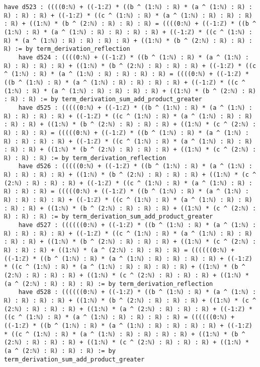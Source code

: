 \documentclass{article}
\begin{document}
\begin{tcolorbox}[colback=white!10, width=\linewidth]
\begin{lstlisting}[language=Lean4]
    have d523 : ((((0:ℕ) + ((-1:ℤ) * ((b ^ (1:ℕ) : ℝ) * (a ^ (1:ℕ) : ℝ) : ℝ) : ℝ) : ℝ) + ((-1:ℤ) * ((c ^ (1:ℕ) : ℝ) * (a ^ (1:ℕ) : ℝ) : ℝ) : ℝ) : ℝ) + ((1:ℕ) * (b ^ (2:ℕ) : ℝ) : ℝ) : ℝ) = ((((0:ℕ) + ((-1:ℤ) * ((b ^ (1:ℕ) : ℝ) * (a ^ (1:ℕ) : ℝ) : ℝ) : ℝ) : ℝ) + ((-1:ℤ) * ((c ^ (1:ℕ) : ℝ) * (a ^ (1:ℕ) : ℝ) : ℝ) : ℝ) : ℝ) + ((1:ℕ) * (b ^ (2:ℕ) : ℝ) : ℝ) : ℝ) := by term_derivation_reflection
    have d524 : ((((0:ℕ) + ((-1:ℤ) * ((b ^ (1:ℕ) : ℝ) * (a ^ (1:ℕ) : ℝ) : ℝ) : ℝ) : ℝ) + ((1:ℕ) * (b ^ (2:ℕ) : ℝ) : ℝ) : ℝ) + ((-1:ℤ) * ((c ^ (1:ℕ) : ℝ) * (a ^ (1:ℕ) : ℝ) : ℝ) : ℝ) : ℝ) = ((((0:ℕ) + ((-1:ℤ) * ((b ^ (1:ℕ) : ℝ) * (a ^ (1:ℕ) : ℝ) : ℝ) : ℝ) : ℝ) + ((-1:ℤ) * ((c ^ (1:ℕ) : ℝ) * (a ^ (1:ℕ) : ℝ) : ℝ) : ℝ) : ℝ) + ((1:ℕ) * (b ^ (2:ℕ) : ℝ) : ℝ) : ℝ) := by term_derivation_sum_add_product_greater
    have d525 : (((((0:ℕ) + ((-1:ℤ) * ((b ^ (1:ℕ) : ℝ) * (a ^ (1:ℕ) : ℝ) : ℝ) : ℝ) : ℝ) + ((-1:ℤ) * ((c ^ (1:ℕ) : ℝ) * (a ^ (1:ℕ) : ℝ) : ℝ) : ℝ) : ℝ) + ((1:ℕ) * (b ^ (2:ℕ) : ℝ) : ℝ) : ℝ) + ((1:ℕ) * (c ^ (2:ℕ) : ℝ) : ℝ) : ℝ) = (((((0:ℕ) + ((-1:ℤ) * ((b ^ (1:ℕ) : ℝ) * (a ^ (1:ℕ) : ℝ) : ℝ) : ℝ) : ℝ) + ((-1:ℤ) * ((c ^ (1:ℕ) : ℝ) * (a ^ (1:ℕ) : ℝ) : ℝ) : ℝ) : ℝ) + ((1:ℕ) * (b ^ (2:ℕ) : ℝ) : ℝ) : ℝ) + ((1:ℕ) * (c ^ (2:ℕ) : ℝ) : ℝ) : ℝ) := by term_derivation_reflection
    have d526 : (((((0:ℕ) + ((-1:ℤ) * ((b ^ (1:ℕ) : ℝ) * (a ^ (1:ℕ) : ℝ) : ℝ) : ℝ) : ℝ) + ((1:ℕ) * (b ^ (2:ℕ) : ℝ) : ℝ) : ℝ) + ((1:ℕ) * (c ^ (2:ℕ) : ℝ) : ℝ) : ℝ) + ((-1:ℤ) * ((c ^ (1:ℕ) : ℝ) * (a ^ (1:ℕ) : ℝ) : ℝ) : ℝ) : ℝ) = (((((0:ℕ) + ((-1:ℤ) * ((b ^ (1:ℕ) : ℝ) * (a ^ (1:ℕ) : ℝ) : ℝ) : ℝ) : ℝ) + ((-1:ℤ) * ((c ^ (1:ℕ) : ℝ) * (a ^ (1:ℕ) : ℝ) : ℝ) : ℝ) : ℝ) + ((1:ℕ) * (b ^ (2:ℕ) : ℝ) : ℝ) : ℝ) + ((1:ℕ) * (c ^ (2:ℕ) : ℝ) : ℝ) : ℝ) := by term_derivation_sum_add_product_greater
    have d527 : ((((((0:ℕ) + ((-1:ℤ) * ((b ^ (1:ℕ) : ℝ) * (a ^ (1:ℕ) : ℝ) : ℝ) : ℝ) : ℝ) + ((-1:ℤ) * ((c ^ (1:ℕ) : ℝ) * (a ^ (1:ℕ) : ℝ) : ℝ) : ℝ) : ℝ) + ((1:ℕ) * (b ^ (2:ℕ) : ℝ) : ℝ) : ℝ) + ((1:ℕ) * (c ^ (2:ℕ) : ℝ) : ℝ) : ℝ) + ((1:ℕ) * (a ^ (2:ℕ) : ℝ) : ℝ) : ℝ) = ((((((0:ℕ) + ((-1:ℤ) * ((b ^ (1:ℕ) : ℝ) * (a ^ (1:ℕ) : ℝ) : ℝ) : ℝ) : ℝ) + ((-1:ℤ) * ((c ^ (1:ℕ) : ℝ) * (a ^ (1:ℕ) : ℝ) : ℝ) : ℝ) : ℝ) + ((1:ℕ) * (b ^ (2:ℕ) : ℝ) : ℝ) : ℝ) + ((1:ℕ) * (c ^ (2:ℕ) : ℝ) : ℝ) : ℝ) + ((1:ℕ) * (a ^ (2:ℕ) : ℝ) : ℝ) : ℝ) := by term_derivation_reflection
    have d528 : ((((((0:ℕ) + ((-1:ℤ) * ((b ^ (1:ℕ) : ℝ) * (a ^ (1:ℕ) : ℝ) : ℝ) : ℝ) : ℝ) + ((1:ℕ) * (b ^ (2:ℕ) : ℝ) : ℝ) : ℝ) + ((1:ℕ) * (c ^ (2:ℕ) : ℝ) : ℝ) : ℝ) + ((1:ℕ) * (a ^ (2:ℕ) : ℝ) : ℝ) : ℝ) + ((-1:ℤ) * ((c ^ (1:ℕ) : ℝ) * (a ^ (1:ℕ) : ℝ) : ℝ) : ℝ) : ℝ) = ((((((0:ℕ) + ((-1:ℤ) * ((b ^ (1:ℕ) : ℝ) * (a ^ (1:ℕ) : ℝ) : ℝ) : ℝ) : ℝ) + ((-1:ℤ) * ((c ^ (1:ℕ) : ℝ) * (a ^ (1:ℕ) : ℝ) : ℝ) : ℝ) : ℝ) + ((1:ℕ) * (b ^ (2:ℕ) : ℝ) : ℝ) : ℝ) + ((1:ℕ) * (c ^ (2:ℕ) : ℝ) : ℝ) : ℝ) + ((1:ℕ) * (a ^ (2:ℕ) : ℝ) : ℝ) : ℝ) := by term_derivation_sum_add_product_greater

\end{lstlisting}
\end{tcolorbox}
\end{document}
